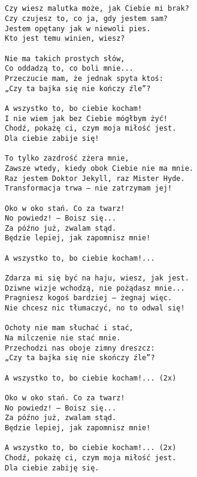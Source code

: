 \documentclass[12pt]{article}
\begin{document}
\subsection*{}
\begin{verbatim}
Czy wiesz malutka może, jak Ciebie mi brak?
Czy czujesz to, co ja, gdy jestem sam?
Jestem opętany jak w niewoli pies.
Kto jest temu winien, wiesz?

Nie ma takich prostych słów,
Co oddadzą to, co boli mnie...
Przeczucie mam, że jednak spyta ktoś:
„Czy ta bajka się nie kończy źle”?

A wszystko to, bo ciebie kocham!
I nie wiem jak bez Ciebie mógłbym żyć!
Chodź, pokażę ci, czym moja miłość jest.
Dla ciebie zabije się!

To tylko zazdrość zżera mnie,
Zawsze wtedy, kiedy obok Ciebie nie ma mnie.
Raz jestem Doktor Jekyll, raz Mister Hyde.
Transformacja trwa – nie zatrzymam jej!

Oko w oko stań. Co za twarz!
No powiedz! – Boisz się...
Za późno już, zwalam stąd.
Będzie lepiej, jak zapomnisz mnie!

A wszystko to, bo ciebie kocham!...

Zdarza mi się być na haju, wiesz, jak jest.
Dziwne wizje wchodzą, nie pożądasz mnie...
Pragniesz kogoś bardziej – żegnaj więc.
Nie chcesz nic tłumaczyć, no to odwal się!

Ochoty nie mam słuchać i stać,
Na milczenie nie stać mnie.
Przechodzi nas oboje zimny dreszcz:
„Czy ta bajka się nie skończy źle”?

A wszystko to, bo ciebie kocham!... (2x)

Oko w oko stań. Co za twarz!
No powiedz! – Boisz się...
Za późno już, zwalam stąd.
Będzie lepiej, jak zapomnisz mnie!

A wszystko to, bo ciebie kocham!... (2x)
Chodź, pokażę ci, czym moja miłość jest.
Dla ciebie zabiję się.
\end{verbatim}
\clearpage
\end{document}
